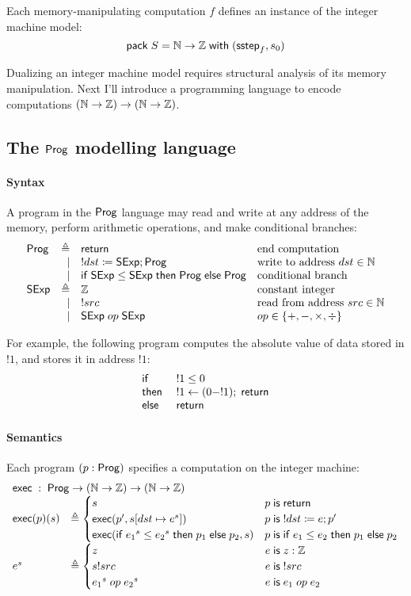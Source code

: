 Each memory-manipulating computation $f$ defines an instance of the integer
machine model:
\[\mathsf{pack}\;S=\mathbb N\to\mathbb Z\;\mathsf{with}\;(\mathsf{sstep}_f,s_0)\]

Dualizing an integer machine model requires structural analysis of its memory
manipulation.  Next I'll introduce a programming language to encode computations
$(\mathbb N\to\mathbb Z)\to(\mathbb N\to\mathbb Z)$.

\subsection{The $\mathsf{Prog}$ modelling language}
\paragraph{Syntax}
A program in the $\mathsf{Prog}$ language may read and write at any address of the
memory, perform arithmetic operations, and make conditional branches:
\[\begin{array}{lrll}
\Prog&\triangleq&\Return&\text{end computation}\\
&\mid&!dst\coloneqq\Sexp;\Prog&\text{write to address }dst\in\Nat\\\null
&\mid&\If\Sexp\le\Sexp\Then\Prog\Else\Prog&\text{conditional branch}\\
\Sexp&\triangleq&\Int&\text{constant integer}\\
&\mid&!src&\text{read from address }src\in\Nat\\
&\mid&\Sexp\oop\Sexp&op\in\{+,-,\times,\div\}
\end{array}\]

For example, the following program computes the absolute value of data stored in
$!1$, and stores it in address $!1$:
\[\begin{array}{ll}
  \mathsf{if}\;&!1\le0\\
  \mathsf{then}\;&!1\gets(0-!1);\;\mathsf{return}\\
  \mathsf{else}\;&\mathsf{return}
\end{array}\]

\paragraph{Semantics}
Each program $(p:\mathsf{Prog})$ specifies a computation on the integer machine:
\[\begin{array}{ll}
\multicolumn{2}{l}{\Exec\;:\;\Prog\to(\Nat\to\Int)\to(\Nat\to\Int)}\\
\Exec(p)(s)&\triangleq
\begin{cases}
  s&p\Is\Return\\
  \Exec(p',\update{s}{dst}{e^s})&p\Is !dst\coloneqq e;p'\\
  \Exec(\If {e_1}^s\le{e_2}^s\Then p_1\Else p_2,s)&p\Is\If e_1\le e_2\Then p_1\Else p_2
\end{cases}\\
e^s&\triangleq
\begin{cases}
  z\hphantom{\Exec(\If {e_1}^s\le{e_2}^s\Then p_1\Else p_2,)}&e\Is z:\Int\\
  s!src&e\Is !src\\
  {e_1}^s\oop{e_2}^s&e\Is e_1\oop e_2
\end{cases}
\end{array}\]

